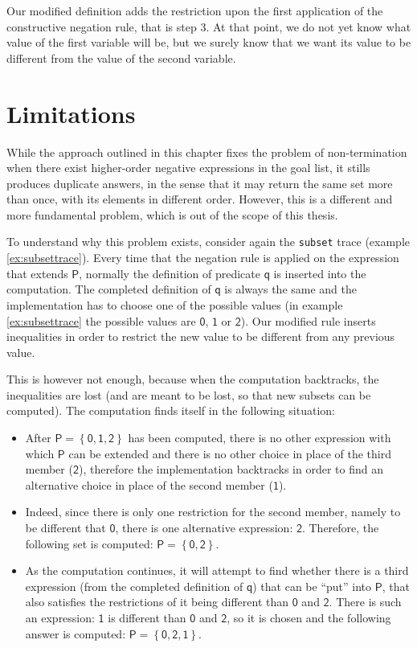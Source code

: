 \documentclass[inscr,ack,preface]{dithesis}
\theoremstyle{definition}
\newcommand{\msf}[1]{$\mathsf{#1}$}
\begin{document}
Our modified definition adds the restriction upon the first application of the constructive negation rule, that is step 3. At that point, we do not yet know what value of the first variable will be, but we surely know that we want its value to be different from the value of the second variable.

\section{Limitations}
\label{section:limitations}
While the approach outlined in this chapter fixes the problem of non-termination when there exist higher-order negative expressions in the goal list, it stills produces duplicate answers, in the sense that it may return the same set more than once, with its elements in different order. However, this is a different and more fundamental problem, which is out of the scope of this thesis.

To understand why this problem exists, consider again the \texttt{subset} trace (example \ref{ex:subsettrace}). Every time that the negation rule is applied on the expression that extends \msf{P}, normally the definition of predicate \msf{q} is inserted into the computation. The completed definition of \msf{q} is always the same and the implementation has to choose one of the possible values (in example \ref{ex:subsettrace} the possible values are \msf{0}, \msf{1} or \msf{2}). Our modified rule inserts inequalities in order to restrict the new value to be different from any previous value.

This is however not enough, because when the computation backtracks, the inequalities are lost (and are meant to be lost, so that new subsets can be computed). The computation finds itself in the following situation:

\begin{itemize}
\item After \msf{P = \left\{ 0, 1, 2 \right\}} has been computed, there is no other expression with which \msf{P} can be extended and there is no other choice in place of the third member (\msf{2}), therefore the implementation backtracks in order to find an alternative choice in place of the second member (\msf{1}).
\item Indeed, since there is only one restriction for the second member, namely to be different that \msf{0}, there is one alternative expression: \msf{2}. Therefore, the following set is computed: \msf{P = \left\{ 0, 2 \right\}}.
\item As the computation continues, it will attempt to find whether there is a third expression (from the completed definition of \msf{q}) that can be ``put'' into \msf{P}, that also satisfies the restrictions of it being different than \msf{0} and \msf{2}. There is such an expression: \msf{1} is different than \msf{0} and \msf{2}, so it is chosen and the following answer is computed: \msf{P = \left\{ 0, 2, 1 \right\}}.
\end{itemize}
\end{document}
